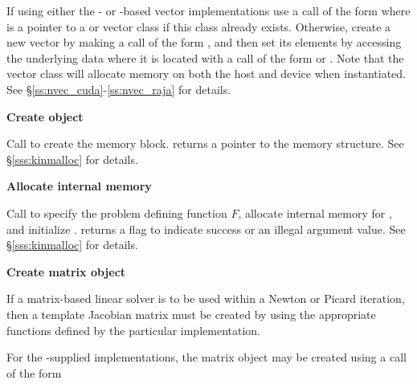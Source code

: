 \begin{Steps}
  If using either the {\cuda}- or {\raja}-based vector implementations
  use a call of the form
   where  is a pointer to a 
  or  vector class if this class already exists.  Otherwise,
  create a new vector
  by making a call of the form , and then set its
  elements by accessing the underlying data where it is located
  with a call of the form
   or .
  Note that the vector class will allocate memory on both the host and device
  when instantiated.  See \S\ref{ss:nvec_cuda}-\ref{ss:nvec_raja} for details.


\item\label{i:kinsol_create}
  {\bf Create {\kinsol} object}

  Call  to create the {\kinsol} memory block.
   returns a pointer to the {\kinsol} memory structure.
  See \S\ref{sss:kinmalloc} for details.

\item\label{i:kinsol_malloc}
  {\bf Allocate internal memory}

  Call 
  to specify the problem defining function $F$,
  allocate internal memory for {\kinsol},
  and initialize {\kinsol}.
   returns a flag to indicate success or an illegal argument value.
  See \S\ref{sss:kinmalloc} for details.

\item\label{i:matrix}
  {\bf Create matrix object}

  If a matrix-based linear solver is to be used within a Newton or Picard iteration,
  then a template Jacobian matrix must be created by using the
  appropriate functions defined by the particular {\sunmatrix}
  implementation.

  For the {\sundials}-supplied {\sunmatrix} implementations, the
  matrix object may be created using a call of the form



\end{Steps}
